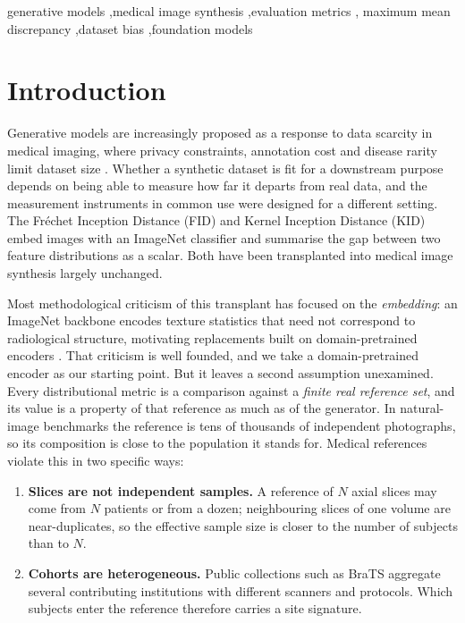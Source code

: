 \documentclass[preprint,12pt,authoryear]{elsarticle}
\begin{document}
\begin{frontmatter}
\begin{keyword}
generative models \sep medical image synthesis \sep evaluation metrics \sep
maximum mean discrepancy \sep dataset bias \sep foundation models
\end{keyword}

\end{frontmatter}

\section{Introduction}
\label{sec:intro}

Generative models are increasingly proposed as a response to data scarcity in
medical imaging, where privacy constraints, annotation cost and disease rarity
limit dataset size \citep{kebaili2023deep, kazerouni2023diffusion}. Whether a
synthetic dataset is fit for a downstream purpose depends on being able to
measure how far it departs from real data, and the measurement instruments in
common use were designed for a different setting. The Fr\'echet Inception
Distance (FID) \citep{heusel2017gans} and Kernel Inception Distance (KID)
\citep{binkowski2018demystifying} embed images with an ImageNet classifier and
summarise the gap between two feature distributions as a scalar. Both have been
transplanted into medical image synthesis largely unchanged.

Most methodological criticism of this transplant has focused on the
\emph{embedding}: an ImageNet backbone encodes texture statistics that need not
correspond to radiological structure, motivating replacements built on
domain-pretrained encoders \citep{dohmen2025similarity, woodland2024feature}.
That criticism is well founded, and we take a domain-pretrained encoder as our
starting point. But it leaves a second assumption unexamined. Every
distributional metric is a comparison against a \emph{finite real reference
set}, and its value is a property of that reference as much as of the generator.
In natural-image benchmarks the reference is tens of thousands of independent
photographs, so its composition is close to the population it stands for.
Medical references violate this in two specific ways:

\begin{enumerate}[leftmargin=*, topsep=2pt, itemsep=2pt]
\item \textbf{Slices are not independent samples.} A reference of $N$ axial
      slices may come from $N$ patients or from a dozen; neighbouring slices of
      one volume are near-duplicates, so the effective sample size is closer to
      the number of subjects than to $N$.
\item \textbf{Cohorts are heterogeneous.} Public collections such as BraTS
      aggregate several contributing institutions with different scanners and
      protocols. Which subjects enter the reference therefore carries a site
      signature.
\end{enumerate}
\end{document}
